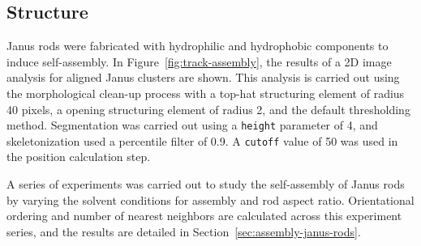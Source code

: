 \subsection{Structure}


Janus rods were fabricated with hydrophilic and hydrophobic components to induce self-assembly.
In Figure~\ref{fig:track-assembly}, the results of a 2D image analysis for aligned Janus clusters
are shown.  This analysis is carried out using the morphological clean-up process with
a top-hat structuring element of radius 40 pixels, a opening structuring element of
radius 2, and the default thresholding method. Segmentation was carried out using a 
\texttt{height} parameter of 4, and skeletonization used a percentile filter of 0.9.  A 
\texttt{cutoff} value of 50 was used in the position calculation step.

A series of experiments was carried out to study the self-assembly of Janus rods by varying
the solvent conditions for assembly and rod aspect ratio.  Orientational ordering and
number of nearest neighbors are calculated across this experiment series, and the results are
detailed in Section~\ref{sec:assembly-janus-rods}.
